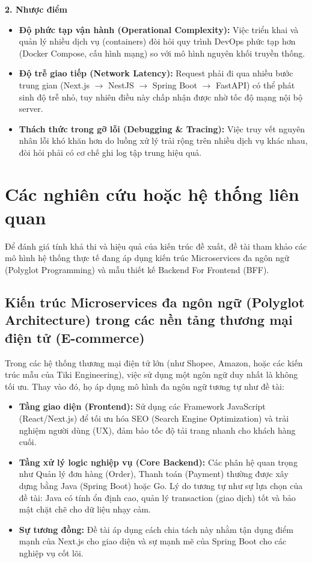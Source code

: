 \documentclass[12pt,a4paper]{report}
\begin{document}
\textbf{2. Nhược điểm}
\begin{itemize}
    \item \textbf{Độ phức tạp vận hành (Operational Complexity):} Việc triển khai và quản lý nhiều dịch vụ (containers) đòi hỏi quy trình DevOps phức tạp hơn (Docker Compose, cấu hình mạng) so với mô hình nguyên khối truyền thống.
    \item \textbf{Độ trễ giao tiếp (Network Latency):} Request phải đi qua nhiều bước trung gian (Next.js $\rightarrow$ NestJS $\rightarrow$ Spring Boot $\rightarrow$ FastAPI) có thể phát sinh độ trễ nhỏ, tuy nhiên điều này chấp nhận được nhờ tốc độ mạng nội bộ server.
    \item \textbf{Thách thức trong gỡ lỗi (Debugging \& Tracing):} Việc truy vết nguyên nhân lỗi khó khăn hơn do luồng xử lý trải rộng trên nhiều dịch vụ khác nhau, đòi hỏi phải có cơ chế ghi log tập trung hiệu quả.
\end{itemize}


\section{Các nghiên cứu hoặc hệ thống liên quan}
Để đánh giá tính khả thi và hiệu quả của kiến trúc đề xuất, đề tài tham khảo các mô hình hệ thống thực tế đang áp dụng kiến trúc Microservices đa ngôn ngữ (Polyglot Programming) và mẫu thiết kế Backend For Frontend (BFF).

\subsection{Kiến trúc Microservices đa ngôn ngữ (Polyglot Architecture) trong các nền tảng thương mại điện tử (E-commerce)}
Trong các hệ thống thương mại điện tử lớn (như Shopee, Amazon, hoặc các kiến trúc mẫu của Tiki Engineering), việc sử dụng một ngôn ngữ duy nhất là không tối ưu. Thay vào đó, họ áp dụng mô hình đa ngôn ngữ tương tự như đề tài:
\begin{itemize}
    \item \textbf{Tầng giao diện (Frontend):} Sử dụng các Framework JavaScript (React/Next.js) để tối ưu hóa SEO (Search Engine Optimization) và trải nghiệm người dùng (UX), đảm bảo tốc độ tải trang nhanh cho khách hàng cuối.
    \item \textbf{Tầng xử lý logic nghiệp vụ (Core Backend):} Các phân hệ quan trọng như Quản lý đơn hàng (Order), Thanh toán (Payment) thường được xây dựng bằng Java (Spring Boot) hoặc Go. Lý do tương tự như sự lựa chọn của đề tài: Java có tính ổn định cao, quản lý transaction (giao dịch) tốt và bảo mật chặt chẽ cho dữ liệu nhạy cảm.
    \item \textbf{Sự tương đồng:} Đề tài áp dụng cách chia tách này nhằm tận dụng điểm mạnh của Next.js cho giao diện và sự mạnh mẽ của Spring Boot cho các nghiệp vụ cốt lõi.
\end{itemize}
\end{document}
